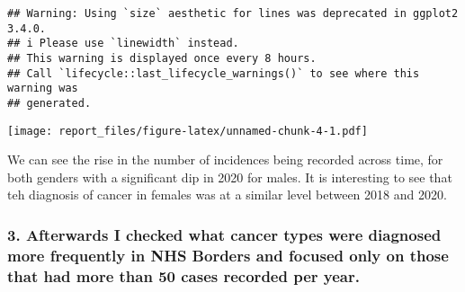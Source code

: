 \documentclass[
]{article}
\begin{document}
\begin{verbatim}
## Warning: Using `size` aesthetic for lines was deprecated in ggplot2 3.4.0.
## i Please use `linewidth` instead.
## This warning is displayed once every 8 hours.
## Call `lifecycle::last_lifecycle_warnings()` to see where this warning was
## generated.
\end{verbatim}

\texttt{[image: report\_files/figure-latex/unnamed-chunk-4-1.pdf]}

We can see the rise in the number of incidences being recorded across
time, for both genders with a significant dip in 2020 for males. It is
interesting to see that teh diagnosis of cancer in females was at a
similar level between 2018 and 2020.

\hypertarget{afterwards-i-checked-what-cancer-types-were-diagnosed-more-frequently-in-nhs-borders-and-focused-only-on-those-that-had-more-than-50-cases-recorded-per-year.}{%
\subsubsection{3. Afterwards I checked what cancer types were diagnosed
more frequently in NHS Borders and focused only on those that had more
than 50 cases recorded per
year.}\label{afterwards-i-checked-what-cancer-types-were-diagnosed-more-frequently-in-nhs-borders-and-focused-only-on-those-that-had-more-than-50-cases-recorded-per-year.}}
\end{document}
